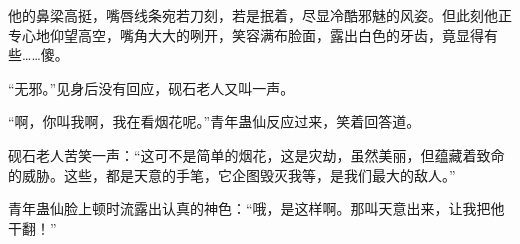\begin{this_body}
他的鼻梁高挺，嘴唇线条宛若刀刻，若是抿着，尽显冷酷邪魅的风姿。但此刻他正专心地仰望高空，嘴角大大的咧开，笑容满布脸面，露出白色的牙齿，竟显得有些……傻。

“无邪。”见身后没有回应，砚石老人又叫一声。

“啊，你叫我啊，我在看烟花呢。”青年蛊仙反应过来，笑着回答道。

砚石老人苦笑一声：“这可不是简单的烟花，这是灾劫，虽然美丽，但蕴藏着致命的威胁。这些，都是天意的手笔，它企图毁灭我等，是我们最大的敌人。”

青年蛊仙脸上顿时流露出认真的神色：“哦，是这样啊。那叫天意出来，让我把他干翻！”

\end{this_body}

